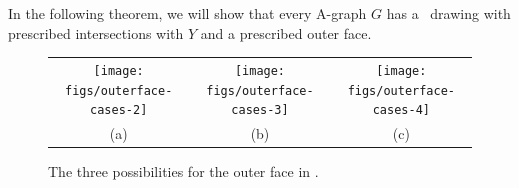%
%

In the following theorem,
we will show that every A-graph $G$ has a \Fary\ drawing with prescribed intersections with $Y$ and a prescribed outer face.

\begin{figure}
   \begin{center}\begin{tabular}{ccc}
      \texttt{[image: figs/outerface-cases-2]} & 
      \texttt{[image: figs/outerface-cases-3]} & 
      \texttt{[image: figs/outerface-cases-4]} \\
      (a) & (b) & (c)
   \end{tabular}\end{center}
   \caption{The three possibilities for the outer face in
     .
   }
\end{figure} 

